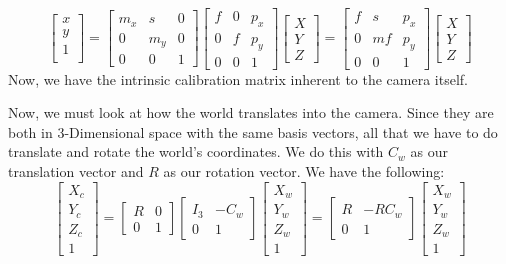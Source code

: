 \documentclass{article}
\begin{document}
\begin{itemize}
     $$\begin{bmatrix}
    x\\y\\1\\
    \end{bmatrix} = \begin{bmatrix}
    m_x&s&0\\0&m_y&0\\0&0&1
    \end{bmatrix}\begin{bmatrix}
    f&0&p_x\\0&f&p_y\\0&0&1
    \end{bmatrix}\begin{bmatrix}
    X\\Y\\Z
    \end{bmatrix} = \begin{bmatrix}
    f&s&p_x\\0&mf&p_y\\0&0&1
    \end{bmatrix}\begin{bmatrix}
    X\\Y\\Z
    \end{bmatrix}$$
    Now, we have the intrinsic calibration matrix inherent to the camera itself. 
\end{itemize}
Now, we must look at how the world translates into the camera. Since they are both in 3-Dimensional space with the same basis vectors, all that we have to do translate and rotate the world's coordinates. We do this with $C_w$ as our translation vector and $R$ as our rotation vector. We have the following:
$$\begin{bmatrix}
X_c\\Y_c\\Z_c\\1
\end{bmatrix} = \begin{bmatrix}
R & 0 \\
0 & 1
\end{bmatrix}\begin{bmatrix}
I_3 & -C_w \\
0 & 1
\end{bmatrix}\begin{bmatrix}
X_w\\Y_w\\Z_w\\1
\end{bmatrix} = \begin{bmatrix}
R & -RC_w \\
0 & 1
\end{bmatrix}\begin{bmatrix}
X_w\\Y_w\\Z_w\\1
\end{bmatrix} $$
\end{document}
